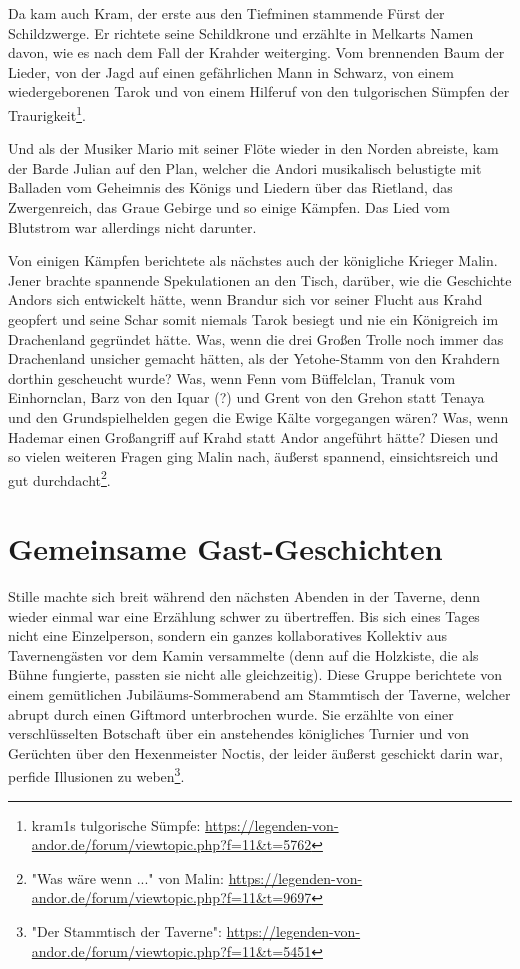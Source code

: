 Da kam auch Kram, der erste aus den Tiefminen stammende Fürst der Schildzwerge. Er richtete seine Schildkrone und erzählte in Melkarts Namen davon, wie es nach dem Fall der Krahder weiterging. Vom brennenden Baum der Lieder, von der Jagd auf einen gefährlichen Mann in Schwarz, von einem wiedergeborenen Tarok und von einem Hilferuf von den tulgorischen Sümpfen der Traurigkeit\footnote{kram1s tulgorische Sümpfe: \url{https://legenden-von-andor.de/forum/viewtopic.php?f=11&t=5762}}.

Und als der Musiker Mario mit seiner Flöte wieder in den Norden abreiste, kam der Barde Julian auf den Plan, welcher die Andori musikalisch belustigte mit Balladen vom Geheimnis des Königs und Liedern über das Rietland, das Zwergenreich, das Graue Gebirge und so einige Kämpfen. Das Lied vom Blutstrom war allerdings nicht darunter.

Von einigen Kämpfen berichtete als nächstes auch der königliche Krieger Malin. Jener brachte spannende Spekulationen an den Tisch, darüber, wie die Geschichte Andors sich entwickelt hätte, wenn Brandur sich vor seiner Flucht aus Krahd geopfert und seine Schar somit niemals Tarok besiegt und nie ein Königreich im Drachenland gegründet hätte. Was, wenn die drei Großen Trolle noch immer das Drachenland unsicher gemacht hätten, als der Yetohe-Stamm von den Krahdern dorthin gescheucht wurde? Was, wenn Fenn vom Büffelclan, Tranuk vom Einhornclan, Barz von den Iquar (?) und Grent von den Grehon statt Tenaya und den Grundspielhelden gegen die Ewige Kälte vorgegangen wären? Was, wenn Hademar einen Großangriff auf Krahd statt Andor angeführt hätte? Diesen und so vielen weiteren Fragen ging Malin nach, äußerst spannend, einsichtsreich und gut durchdacht\footnote{"Was wäre wenn ..." von Malin: \url{https://legenden-von-andor.de/forum/viewtopic.php?f=11&t=9697}}.


\newpage
\section{Gemeinsame Gast-Geschichten}

Stille machte sich breit während den nächsten Abenden in der Taverne, denn wieder einmal war eine Erzählung schwer zu übertreffen. Bis sich eines Tages nicht eine Einzelperson, sondern ein ganzes kollaboratives Kollektiv aus Tavernengästen vor dem Kamin versammelte (denn auf die Holzkiste, die als Bühne fungierte, passten sie nicht alle gleichzeitig). Diese Gruppe berichtete von einem gemütlichen Jubiläums-Sommerabend am Stammtisch der Taverne, welcher abrupt durch einen Giftmord unterbrochen wurde. Sie erzählte von einer verschlüsselten Botschaft über ein anstehendes königliches Turnier und von Gerüchten über den Hexenmeister Noctis, der leider äußerst geschickt darin war, perfide Illusionen zu weben\footnote{"Der Stammtisch der Taverne": \url{https://legenden-von-andor.de/forum/viewtopic.php?f=11&t=5451}}. 

